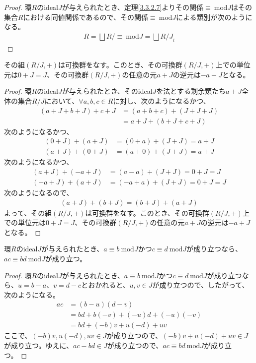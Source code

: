\documentclass[dvipdfmx]{jsarticle}
\begin{document}
\begin{proof}
環$R$のideal$J$が与えられたとき、定理\ref{3.3.2.7}よりその関係$\equiv \ \mathrm{mod}J$はその集合$R$における同値関係であるので、その関係$\equiv\ \mathrm{mod}J$による類別が次のようになる。
\begin{align*}
R=\bigsqcup {R}/{\equiv\ \mathrm{mod}J}=\bigsqcup {R/J}_l
\end{align*}
\end{proof}
\begin{thm}\label{3.3.2.9}
その組$\left( {R}/{J}, + \right)$は可換群をなす。このとき、その可換群$\left( {R}/{J}, + \right)$上での単位元は$0 + J = J$、その可換群$\left( {R}/{J}, + \right)$の任意の元$a + J$の逆元は$- a + J$となる。
\end{thm}
\begin{proof}
環$R$のideal$J$が与えられたとき、そのideal$J$を法とする剰余類たち$a + J$全体の集合${R}/{J}$において、$\forall a,b,c \in R$に対し、次のようになるかつ、
\begin{align*}
(a + J + b + J) + c + J &= (a + b + c) + (J + J + J)\\
&= a + J + (b + J + c + J)
\end{align*}
次のようになるかつ、
\begin{align*}
(0 + J) + (a + J) &= (0 + a) + (J + J) = a + J\\
(a + J) + (0 + J) &= (a + 0) + (J + J) = a + J
\end{align*}
次のようになるかつ、
\begin{align*}
(a + J) + ( - a + J) &= (a - a) + (J + J) = 0 + J = J\\
( - a + J) + (a + J) &= ( - a + a) + (J + J) = 0 + J = J
\end{align*}
次のようになるので、
\begin{align*}
(a + J) + (b + J) = (b + J) + (a + J)
\end{align*}
よって、その組$\left( {R}/{J}, + \right)$は可換群をなす。このとき、その可換群$\left( {R}/{J}, + \right)$上での単位元は$0 + J = J$、その可換群$\left( {R}/{J}, + \right)$の任意の元$a + J$の逆元は$- a + J$となる。
\end{proof}
\begin{thm}\label{3.3.2.10}
環$R$のideal$J$が与えられたとき、$a \equiv b\ \mathrm{mod}J $かつ$c \equiv d\ \mathrm{mod}J $が成り立つなら、$ac \equiv bd\ \mathrm{mod}J $が成り立つ。
\end{thm}
\begin{proof}
環$R$のideal$J$が与えられたとき、$a \equiv b\ \mathrm{mod}J $かつ$c \equiv d\ \mathrm{mod}J $が成り立つなら、$u = b - a$、$v = d - c$とおかれると、$u,v \in J$が成り立つので、したがって、次のようになる。
\begin{align*}
ac &= (b - u)(d - v)\\
&= bd + b( - v) + ( - u)d + ( - u)( - v)\\
&= bd + ( - b)v + u( - d) + uv
\end{align*}
ここで、$( - b)v,u( - d),uv \in J$が成り立つので、$( - b)v + u( - d) + uv \in J$が成り立つ。ゆえに、$ac - bd \in J$が成り立つので、$ac \equiv bd\ \mathrm{mod}J $が成り立つ。
\end{proof}
\end{document}
